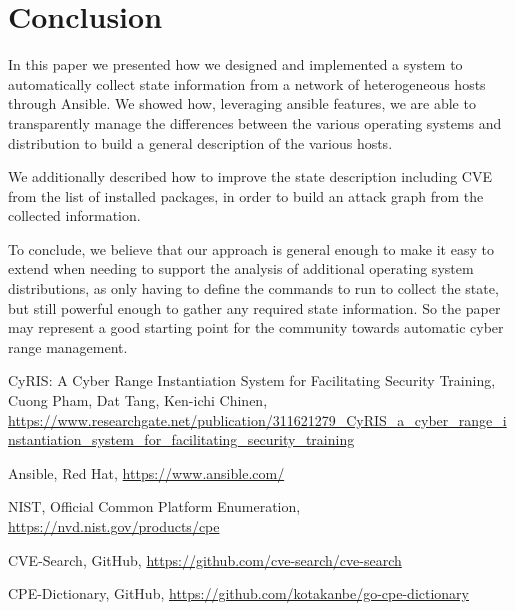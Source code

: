 \documentclass[11pt]{article}
\begin{document}
\section{Conclusion}

In this paper we presented how we designed and implemented a system to automatically collect state information from a network of heterogeneous hosts through Ansible. We showed how, leveraging ansible features, we are able to transparently manage the differences between the various operating systems and distribution to build a general description of the various hosts. 

We additionally described how to improve the state description including CVE from the list of installed packages, in order to build an attack graph from the collected information. 

To conclude, we believe that our approach is general enough to make it easy to extend when needing to support the analysis of additional operating system distributions, as only having to define the commands to run to collect the state, but still powerful enough to gather any required state information. So the paper may represent a good starting point for the community towards automatic cyber range management. 


 
\begin{thebibliography}{99}
		CyRIS: A Cyber Range Instantiation System for Facilitating Security Training,
		Cuong Pham, Dat Tang, Ken-ichi Chinen,
		\url{https://www.researchgate.net/publication/311621279_CyRIS_a_cyber_range_instantiation_system_for_facilitating_security_training}
		
		Ansible,
		Red Hat,
		\url{https://www.ansible.com/}
		
		NIST,
		Official Common Platform Enumeration,
		\url{https://nvd.nist.gov/products/cpe}

		CVE-Search,
		GitHub,
		\url{https://github.com/cve-search/cve-search}
		
		CPE-Dictionary,
		GitHub,
		\url{https://github.com/kotakanbe/go-cpe-dictionary}
		
\end{thebibliography}
\end{document}

